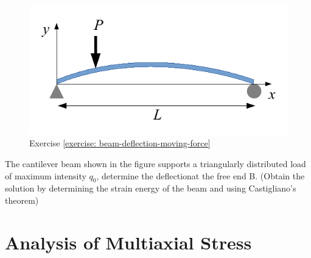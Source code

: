 \documentclass[
10pt,
a4paper,
openany,
svgnames,
]{book} %
\begin{document}
\begin{exercises}
  \begin{figure}[h]
    \centering
    \includegraphics[scale=0.95]{pictures/Static-body-load-analysis/beam-def-moving-force-exercise}
    \caption[]{Exercise \ref{exercise: beam-deflection-moving-force}}
  \end{figure}
  
  \exercise The cantilever beam shown in the figure supports a triangularly distributed load of maximum intensity $q_0$, determine the deflectionat the free end B. (Obtain the solution by determining the strain energy of the beam and using Castigliano’s theorem)

    \begin{figure}[H]
    \centering
  \end{figure}
  
\end{exercises}


\chapter{Analysis of Multiaxial Stress} \label{chapter: multiaxial stress}
\end{document}
